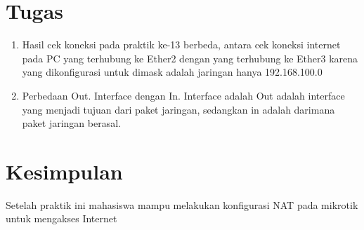 \documentclass[a4paper,12pt]{article}
\begin{document}
\section{Tugas}
\begin{enumerate}
	\item Hasil cek koneksi pada praktik ke-13 berbeda, antara cek koneksi internet pada PC yang terhubung ke Ether2 dengan yang terhubung ke Ether3 karena yang dikonfigurasi untuk dimask adalah jaringan hanya 192.168.100.0
	
	\item Perbedaan Out. Interface dengan In. Interface adalah Out adalah interface yang menjadi tujuan dari paket jaringan, sedangkan in adalah darimana paket jaringan berasal. 
\end{enumerate}

\newpage
\section{Kesimpulan}
Setelah praktik ini mahasiswa mampu melakukan konfigurasi NAT pada mikrotik untuk mengakses Internet
\end{document}
